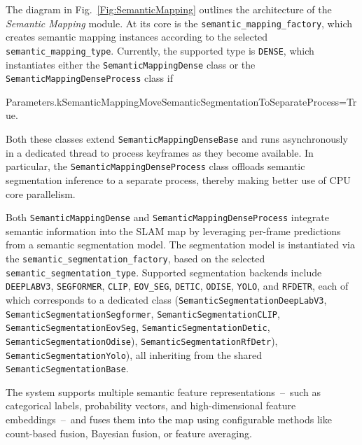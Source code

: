 \documentclass{article}
\newenvironment{Shaded}{\begin{snugshade}}{\end{snugshade}}
\newcommand{\NormalTok}[1]{\textcolor[rgb]{0.74,0.68,0.62}{#1}}
\begin{document}
The diagram in Fig.~\ref{Fig:SemanticMapping} outlines the architecture of the \textit{Semantic Mapping} module. At its core is the \texttt{semantic\_mapping\_factory}, which creates semantic mapping instances according to the selected \texttt{semantic\_mapping\_type}. Currently, the supported type is \texttt{DENSE}, which instantiates either the \texttt{SemanticMappingDense} class or the \texttt{SemanticMappingDenseProcess} class if
\begin{scriptsize}
\begin{Shaded}
\begin{Highlighting}[]
\NormalTok{Parameters.kSemanticMappingMoveSemanticSegmentationToSeparateProcess=True}.
\end{Highlighting}
\end{Shaded}
\end{scriptsize}
Both these classes extend \texttt{SemanticMappingDenseBase} and runs asynchronously in a dedicated thread to process keyframes as they become available. In particular, the \texttt{SemanticMappingDenseProcess} class offloads semantic segmentation inference to a separate process, thereby making better use of CPU core parallelism.

Both \texttt{SemanticMappingDense} and \texttt{SemanticMappingDenseProcess} integrate semantic information into the SLAM map by leveraging per-frame predictions from a semantic segmentation model. The segmentation model is instantiated via the \texttt{semantic\_segmentation\_factory}, based on the selected \texttt{semantic\_segmentation\_type}. Supported segmentation backends include \texttt{DEEPLABV3}\cite{chen2017rethinking}, \texttt{SEGFORMER}\cite{xie2021segformer}, \texttt{CLIP}\cite{lin2023clip}, \texttt{EOV\_SEG}\cite{eov_seg}, \texttt{DETIC}\cite{detic}, \texttt{ODISE}\cite{odise}, \texttt{YOLO}\cite{redmon2016yolo,redmon2017yolo9000,redmon2018yolov3,bochkovskiy2020yolov4,jocher2020yolov5, wang2022yolov7, jocher2023yolov8, sapkota2025ultralytics}, and \texttt{RFDETR}\cite{rfdetr}, each of which corresponds to a dedicated class (\texttt{SemanticSegmentationDeepLabV3}, \texttt{SemanticSegmentationSegformer}, \texttt{SemanticSegmentationCLIP}, \texttt{SemanticSegmentationEovSeg}, \texttt{Semantic\-Segmentation\-Detic}, \texttt{Semantic\-Segmentation\-Odise}), \texttt{Semantic\-Segmentation\-RfDetr}), \texttt{Semantic\-Segmentation\-Yolo}), all inheriting from the shared \texttt{SemanticSegmentationBase}.

The system supports multiple semantic feature representations~--~such as categorical labels, probability vectors, and high-dimensional feature embeddings~--~and fuses them into the map using configurable methods like count-based fusion, Bayesian fusion, or feature averaging.
\end{document}
